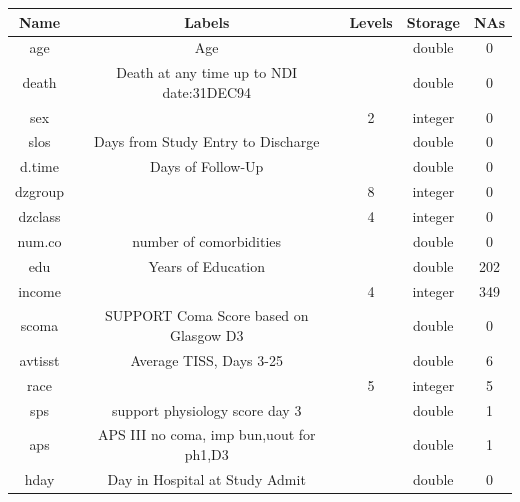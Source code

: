 \documentclass[
]{jss}
\begin{document}
\begin{table}[ht]
\centering
\begin{tabular}{ccccc}
\hline
\textbf{Name} & \textbf{Labels}                          & \textbf{Levels} & \textbf{Storage} & \textbf{NAs} \\
\hline
age           & Age                                      &                 & double           & 0            \\
death         & Death at any time up to NDI date:31DEC94 &                 & double           & 0            \\
sex           &                                          & 2               & integer          & 0            \\
slos          & Days from Study Entry to Discharge       &                 & double           & 0            \\
d.time        & Days of Follow-Up                        &                 & double           & 0            \\
dzgroup       &                                          & 8               & integer          & 0            \\
dzclass       &                                          & 4               & integer          & 0            \\
num.co        & number of comorbidities                  &                 & double           & 0            \\
edu           & Years of Education                       &                 & double           & 202          \\
income        &                                          & 4               & integer          & 349          \\
scoma         & SUPPORT Coma Score based on Glasgow D3   &                 & double           & 0            \\
avtisst       & Average TISS, Days 3-25                  &                 & double           & 6            \\
race          &                                          & 5               & integer          & 5            \\
sps             & support physiology score day 3           &                   & double           & 1            \\
aps           & APS III no coma, imp bun,uout for ph1,D3 &                 & double           & 1            \\
hday            & Day in Hospital at Study Admit             &                 & double           & 0            \\ 

\end{tabular}
\end{table}
\end{document}
